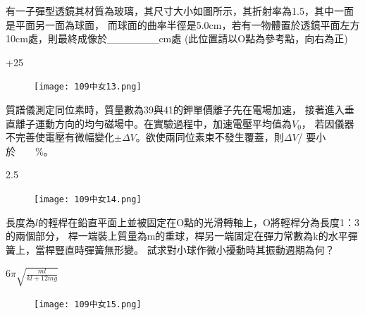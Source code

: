 \documentclass[cn,10pt,math=newtx,chinesefont=founder,device=ig]{elegantbook}
\begin{document}
\begin{example}
  有一子彈型透鏡其材質為玻璃，其尺寸大小如圖所示，其折射率為1.5，其中一面是平面另一面為球面，
  而球面的曲率半徑是5.0cm，若有一物體置於透鏡平面左方10cm處，則最終成像於\_\_\_\_\_\_\_cm處
  (此位置請以O點為參考點，向右為正)\\
  \rightline{[台中女中教甄109]} 
\end{example}
\begin{solution}
  +25
\end{solution}
\begin{figure}[htbp]
  \flushright
  \texttt{[image: 109中女13.png]}
\end{figure}
\newpage

\begin{example}
  質譜儀測定同位素時，質量數為39與41的鉀單價離子先在電場加速，
  接著進入垂直離子運動方向的均勻磁場中。在實驗過程中，加速電壓平均值為$V_0$，
  若因儀器不完善使電壓有微幅變化$\pm \Delta V$。欲使兩同位素束不發生覆蓋，則$\Delta V$/ 要小於\ \ \ \  \%。\\
  \rightline{[台中女中教甄109]} 
\end{example}
\begin{solution}
  2.5
\end{solution}
\begin{figure}[htbp]
  \flushright
  \texttt{[image: 109中女14.png]}
\end{figure}
\newpage
\begin{example}
  長度為$l$的輕桿在鉛直平面上並被固定在O點的光滑轉軸上，O將輕桿分為長度1：3的兩個部分，
  桿一端裝上質量為m的重球，桿另一端固定在彈力常數為k的水平彈簧上，當桿豎直時彈簧無形變。
  試求對小球作微小擾動時其振動週期為何？\\
  \rightline{[台中女中教甄109]} 
\end{example}
\begin{solution}
  $6\pi \sqrt{\frac{ml}{kl+12mg}}$
\end{solution}
\begin{figure}[htbp]
  \flushright
  \texttt{[image: 109中女15.png]}
\end{figure}
\newpage
\end{document}
